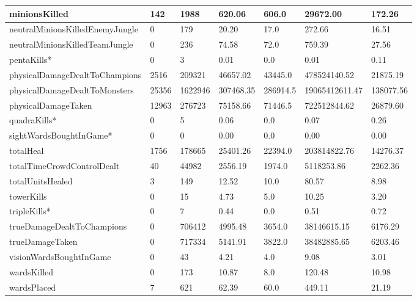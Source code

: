 \begin{table}
\begin{tabular}{p{}p{}p{}p{}p{}p{}p{}}
minionsKilled&                     142&    1988&    620.06&    606.0&       29672.00&    172.26\\ \hline
neutralMinionsKilledEnemyJungle&     0&     179&     20.20&     17.0&         272.66&     16.51\\ \hline
neutralMinionsKilledTeamJungle&      0&     236&     74.58&     72.0&         759.39&     27.56\\ \hline
pentaKills*&                          0&       3&      0.01&      0.0&           0.01&      0.11\\ \hline
physicalDamageDealtToChampions&   2516&  209321&  46657.02&  43445.0&   478524140.52&  21875.19\\ \hline
physicalDamageDealtToMonsters&   25356& 1622946& 307468.35& 286914.5& 19065412611.47& 138077.56\\ \hline
physicalDamageTaken&             12963&  276723&  75158.66&  71446.5&   722512844.62&  26879.60\\ \hline
quadraKills*&                         0&       5&      0.06&      0.0&           0.07&      0.26\\ \hline
sightWardsBoughtInGame*&              0&       0&      0.00&      0.0&           0.00&      0.00\\ \hline
totalHeal&                        1756&  178665&  25401.26&  22394.0&   203814822.76&  14276.37\\ \hline
totalTimeCrowdControlDealt&         40&   44982&   2556.19&   1974.0&     5118253.86&   2262.36\\ \hline
totalUnitsHealed&                    3&     149&     12.52&     10.0&          80.57&      8.98\\ \hline
towerKills&                          0&      15&      4.73&      5.0&          10.25&      3.20\\ \hline
tripleKills*&                         0&       7&      0.44&      0.0&           0.51&      0.72\\ \hline
trueDamageDealtToChampions&          0&  706412&   4995.48&   3654.0&    38146615.15&   6176.29\\ \hline
trueDamageTaken&                     0&  717334&   5141.91&   3822.0&    38482885.65&   6203.46\\ \hline
visionWardsBoughtInGame&             0&      43&      4.21&      4.0&           9.08&      3.01\\ \hline
wardsKilled&                         0&     173&     10.87&      8.0&         120.48&     10.98\\ \hline
wardsPlaced&                         7&     621&     62.39&     60.0&         449.11&     21.19\\ \hline
  \bottomrule
\end{tabular}
\end{table}

